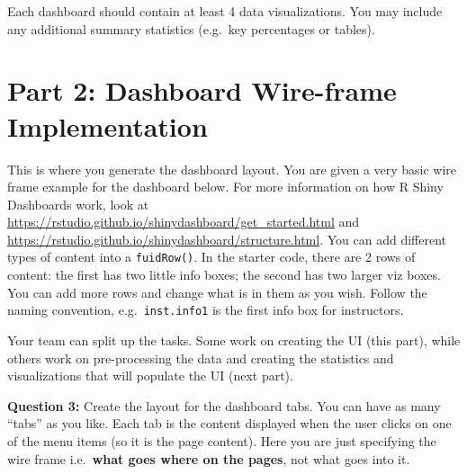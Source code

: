 \documentclass[
]{article}
\begin{document}
Each dashboard should contain at least 4 data visualizations. You may
include any additional summary statistics (e.g.~key percentages or
tables).

\section{Part 2: Dashboard Wire-frame
Implementation}\label{part-2-dashboard-wire-frame-implementation}

This is where you generate the dashboard layout. You are given a very
basic wire frame example for the dashboard below. For more information
on how R Shiny Dashboards work, look at
\url{https://rstudio.github.io/shinydashboard/get_started.html} and
\url{https://rstudio.github.io/shinydashboard/structure.html}. You can
add different types of content into a \texttt{fuidRow()}. In the starter
code, there are 2 rows of content: the first has two little info boxes;
the second has two larger viz boxes. You can add more rows and change
what is in them as you wish. Follow the naming convention,
e.g.~\texttt{inst.info1} is the first info box for instructors.

Your team can split up the tasks. Some work on creating the UI (this
part), while others work on pre-processing the data and creating the
statistics and visualizations that will populate the UI (next part).

\textbf{Question 3:} Create the layout for the dashboard tabs. You can
have as many ``tabs'' as you like. Each tab is the content displayed
when the user clicks on one of the menu items (so it is the page
content). Here you are just specifying the wire frame i.e.~\textbf{what
goes where on the pages}, not what goes into it.
\end{document}
